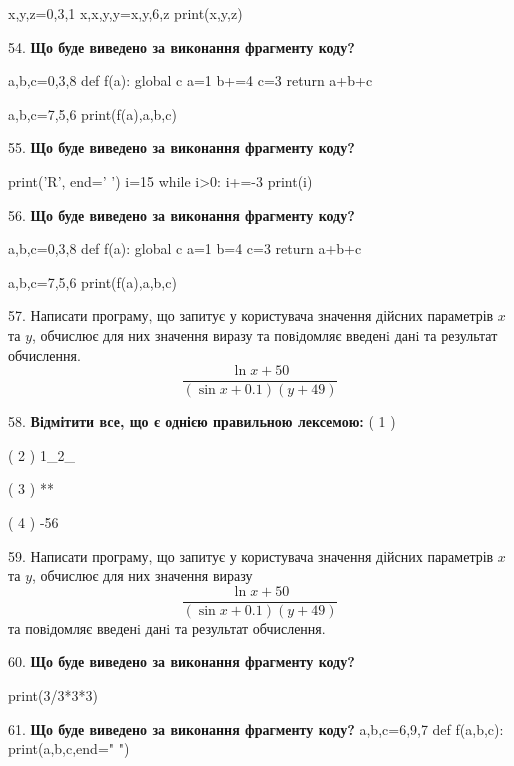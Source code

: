 \documentclass[11pt]{article}
\begin{document}
x,y,z=0,3,1
x,x,y,y=x,y,6,z
print(x,y,z)
\par\vspace{5mm}
54. \textbf{Що буде виведено за виконання фрагменту коду?}

a,b,c=0,3,8
def f(a):
global c    a=1
    b+=4
    c=3
    return a+b+c

a,b,c=7,5,6
print(f(a),a,b,c)
\par\vspace{5mm}
55. \textbf{Що буде виведено за виконання фрагменту коду?}

print('R', end=' ')
i=15
while i>0:
    i+=-3
print(i)

\par\vspace{5mm}
56. \textbf{Що буде виведено за виконання фрагменту коду?}

a,b,c=0,3,8
def f(a):
global c    a=1
    b=4
    c=3
    return a+b+c

a,b,c=7,5,6
print(f(a),a,b,c)
\par\vspace{5mm}
57. 
Написати програму, що запитує у користувача значення дійсних параметрів $x$ та $y$, обчислює для них значення виразу та повiдомляє введенi данi та результат обчислення.
$$\frac{\ln x + 50}{(\sin x + 0.1) (y + 49)}$$ 

\par\vspace{5mm}
58. %
\textbf{Відмітити все, що є однією правильною лексемою:}
( 1 ) %

( 2 ) 1_2_

( 3 ) **

( 4 ) -56
\par\vspace{5mm}
59. 
Написати програму, що запитує у користувача значення дійсних параметрів $x$ та $y$, обчислює для них значення виразу 
$$\frac{\ln x + 50}{(\sin x + 0.1) (y + 49)}$$ 
та повiдомляє введенi данi та результат обчислення.

\par\vspace{5mm}
60. \textbf{Що буде виведено за виконання фрагменту коду?}

print(3/3*3*3)
\par\vspace{5mm}
61. \textbf{Що буде виведено за виконання фрагменту коду?}
a,b,c=6,9,7
def f(a,b,c):
    print(a,b,c,end=" ")
\end{document}
